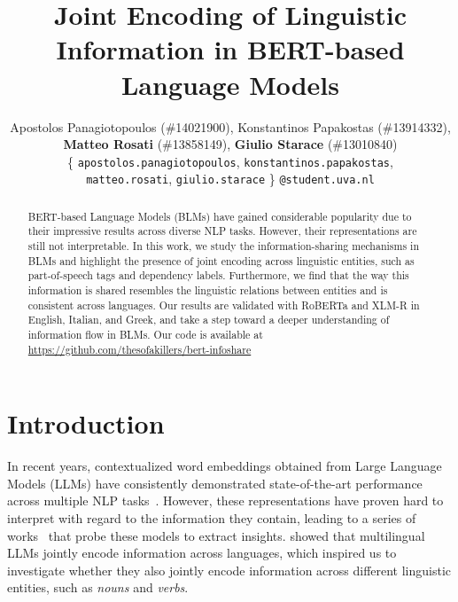 \documentclass[11pt,a4paper]{article}
\title{Joint Encoding of Linguistic Information in BERT-based Language Models}
\author{%
  Apostolos Panagiotopoulos {\nf (\#14021900),} Konstantinos Papakostas {\nf (\#13914332),}\\
  {\bf Matteo Rosati} (\#13858149), {\bf Giulio Starace} (\#13010840)\\[0.25cm]
  \{ \texttt{apostolos.panagiotopoulos}, \texttt{konstantinos.papakostas},\\ \texttt{matteo.rosati}, \texttt{giulio.starace} \} \texttt{@student.uva.nl}
}
\date{}
\begin{document}
\maketitle
\begin{abstract}
BERT-based Language Models (BLMs) have gained considerable popularity due to their impressive results across diverse NLP tasks. However, their representations are still not interpretable. In this work, we study the information-sharing mechanisms in BLMs and highlight the presence of joint encoding across linguistic entities, such as part-of-speech tags and dependency labels. Furthermore, we find that the way this information is shared resembles the linguistic relations between entities and is consistent across languages. Our results are validated with RoBERTa and XLM-R in English, Italian, and Greek, and take a step toward a deeper understanding of information flow in BLMs. Our code is available at \url{https://github.com/thesofakillers/bert-infoshare}
\end{abstract}

\section{Introduction}
\label{section:intro}


In recent years, contextualized word embeddings obtained from Large Language Models (LLMs) have consistently demonstrated state-of-the-art performance across multiple NLP tasks~\citep{devlin_bert_2019, liu_roberta_2019, wu_are_2020}. However, these representations have proven hard to interpret with regard to the information they contain, leading to a series of works~\citep{tenney_what_2018, hewitt_structural_2019, ravishankar_multilingual_2019, libovicky_language_2020, choenni_investigating_2022} that probe these models to extract insights. \citet{choenni_investigating_2022} showed that multilingual LLMs jointly encode information across languages, which inspired us to investigate whether they also jointly encode information across different linguistic entities, such as \textit{nouns} and \textit{verbs}.
\end{document}
